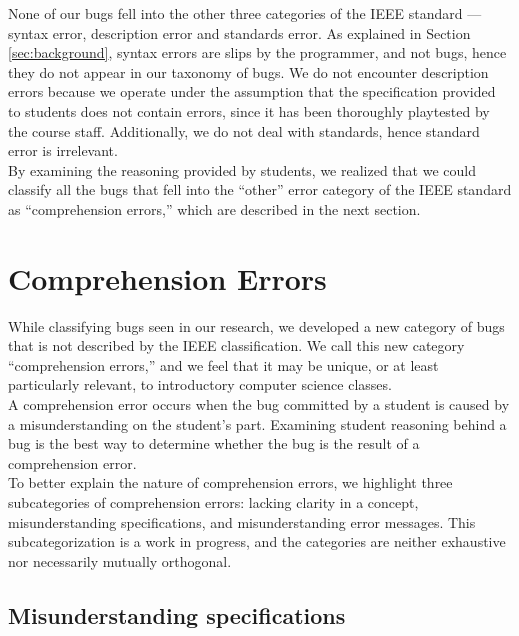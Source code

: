 \documentclass{sig-alternate}
\begin{document}
None of our bugs fell into the other three categories of the IEEE
standard --- syntax error, description error and standards error. As
explained in Section \ref{sec:background}, syntax errors are slips by
the programmer, and not bugs, hence they do not appear in our taxonomy
of bugs. We do not encounter description errors because we operate
under the assumption that the specification provided to students does
not contain errors, since it has been thoroughly playtested by the
course staff. Additionally, we do not deal with standards, hence
standard error is irrelevant.\\

By examining the reasoning provided by students, we realized that we
could classify all the bugs that fell into the ``other'' error
category of the IEEE standard as ``comprehension errors,'' which are
described in the next section.

\newpage
\section{Comprehension Errors}
\label{sec:comprehension}

While classifying bugs seen in our research, we developed a new
category of bugs that is not described by the IEEE classification. We
call this new category ``comprehension errors,'' and we feel that it
may be unique, or at least particularly relevant, to introductory
computer science classes.\\

A comprehension error occurs when the bug committed by a student is
caused by a misunderstanding on the student's part. Examining student
reasoning behind a bug is the best way to determine whether the bug is
the result of a comprehension error.\\

To better explain the nature of comprehension errors, we highlight
three subcategories of comprehension errors: lacking clarity in a
concept, misunderstanding specifications, and misunderstanding error
messages. This subcategorization is a work in progress, and the
categories are neither exhaustive nor necessarily mutually orthogonal.

\subsection{Misunderstanding specifications}
\label{sec:comp1}
\end{document}
